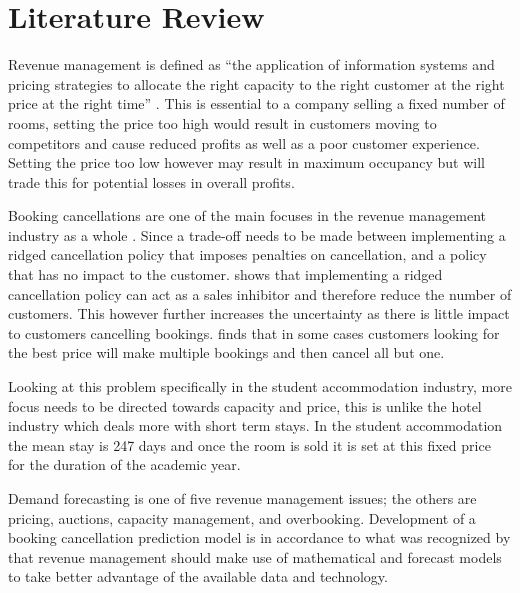 \chapter{Literature Review}
\label{ch:lit_rev}
Revenue management is defined as “the application of information systems and pricing strategies to allocate the right capacity to the right customer at the right price at the right time” \cite{Kimes2003HasAcceptable}. This is essential to a company selling a fixed number of rooms, setting the price too high would result in customers moving to competitors and cause reduced profits as well as a poor customer experience. Setting the price too low however may result in maximum occupancy but will trade this for potential losses in overall profits.

\vspace{5mm}

Booking cancellations are one of the main focuses in the revenue management industry as a whole \cite{Subramanian1999AirlineNo-shows}. Since a trade-off needs to be made between implementing a ridged cancellation policy that imposes penalties on cancellation, and a policy that has no impact to the customer. \cite{Jinhong2007ServiceCancellations} shows that implementing a ridged cancellation policy can act as a sales inhibitor and therefore reduce the number of customers. This however further increases the uncertainty as there is little impact to customers cancelling bookings. \cite{Talluri2004TheManagement} finds that in some cases customers looking for the best price will make multiple bookings and then cancel all but one. 

\vspace{5mm}

Looking at this problem specifically in the student accommodation industry, more focus needs to be directed towards capacity and price, this is unlike the hotel industry which deals more with short term stays. In the student accommodation the mean stay is 247 days and once the room is sold it is set at this fixed price for the duration of the academic year.

 \vspace{5mm}
 
Demand forecasting is one of five revenue management issues; the others are pricing, auctions, capacity management, and overbooking\cite{Chiang2007AnResearch}. Development of a booking cancellation prediction model is in accordance to what was recognized by \cite{Chiang2007AnResearch} that revenue management should make use of mathematical and forecast models to take better advantage of the available data and technology.
 
